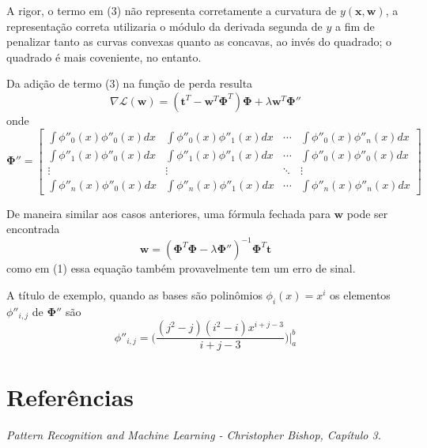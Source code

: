 \documentclass{article}
\begin{document}
A rigor, o termo em (3) não representa corretamente a curvatura de \( y(\textbf{x}, \textbf{w}) \), a representação
correta utilizaria o módulo da derivada segunda de \( y \) a fim de penalizar tanto as curvas convexas quanto as concavas, ao
invés do quadrado; o quadrado é mais coveniente, no entanto.

Da adição de termo (3) na função de perda resulta
\begin{equation}
\nabla \mathcal{L}(\textbf{w}) = (\textbf{t}^T - \textbf{w}^T \boldsymbol{\Phi}^T) \boldsymbol{\Phi} + \lambda \textbf{w}^T \boldsymbol{\Phi}''
\end{equation}
onde
\[
\boldsymbol{\Phi}'' =
\begin{bmatrix}
\int \phi''_0(x) \phi''_0(x) dx & \int \phi''_0(x) \phi''_1(x) dx & \dotsb & \int \phi''_0(x) \phi''_n(x) dx \\
\int \phi''_1(x) \phi''_0(x) dx & \int \phi''_1(x) \phi''_1(x) dx & \dotsb & \int \phi''_0(x) \phi''_0(x) dx \\
\vdots & \vdots & \ddots & \vdots \\
\int \phi''_n(x) \phi''_0(x) dx & \int \phi''_n(x) \phi''_1(x) dx & \dotsb & \int \phi''_n(x) \phi''_n(x) dx
\end{bmatrix}
\]

De maneira similar aos casos anteriores, uma fórmula fechada para \( \textbf{w} \) pode ser encontrada
\[
\textbf{w} = (\boldsymbol{\Phi}^T \boldsymbol{\Phi} - \lambda \boldsymbol{\Phi}'' )^{-1} \boldsymbol{\Phi}^T \textbf{t}
\]
como em (1) essa equação também provavelmente tem um erro de sinal.

A título de exemplo, quando as bases são polinômios \( \phi_i(x) = x^i \) os elementos \( \phi''_{i, j} \) de \( \boldsymbol{\Phi}'' \)
são
\[
\phi''_{i, j} = \Bigg(\frac{(j^2 - j)(i^2 - i)x^{i+j-3}}{i+j-3} \Bigg) \biggr\rvert_{a}^{b}
\]

\section{Referências}

\emph{Pattern Recognition and Machine Learning - Christopher Bishop, Capítulo 3.}
\end{document}
